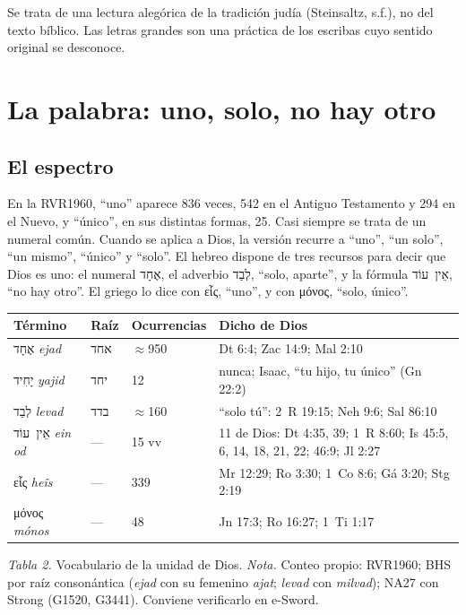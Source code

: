 \documentclass[11pt,letterpaper]{article}
\newcommand{\heb}[1]{\mbox{\foreignlanguage{hebrew}{#1}}}
\newcommand{\grc}[1]{\foreignlanguage{ancientgreek}{#1}}
\begin{document}
\begin{nota}[Precisión]
Se trata de una lectura alegórica de la tradición judía (Steinsaltz, s.f.), no del texto bíblico. Las letras grandes son una práctica de los escribas cuyo sentido original se desconoce.
\end{nota}

\section{La palabra: uno, solo, no hay otro}

\subsection{El espectro}
En la RVR1960, ``uno'' aparece 836 veces, 542 en el Antiguo Testamento y 294 en el Nuevo, y ``único'', en sus distintas formas, 25. Casi siempre se trata de un numeral común. Cuando se aplica a Dios, la versión recurre a ``uno'', ``un solo'', ``un mismo'', ``único'' y ``solo''. El hebreo dispone de tres recursos para decir que Dios es uno: el numeral \heb{אֶחָד}, el adverbio \heb{לְבַד}, ``solo, aparte'', y la fórmula \heb{אֵין עוֹד}, ``no hay otro''. El griego lo dice con \grc{εἷς}, ``uno'', y con \grc{μόνος}, ``solo, único''.

\begin{center}\small\renewcommand{\arraystretch}{1.25}
\begin{tabular}{@{}L{2.8cm}L{1.4cm}L{2.2cm}L{8.0cm}@{}}
\toprule
\textbf{Término} & \textbf{Raíz} & \textbf{Ocurrencias} & \textbf{Dicho de Dios} \\ \midrule
\heb{אֶחָד} \emph{ejad} & \heb{אחד} & $\approx$950 & Dt 6:4; Zac 14:9; Mal 2:10 \\
\heb{יָחִיד} \emph{yajid} & \heb{יחד} & 12 & nunca; Isaac, ``tu hijo, tu único'' (Gn 22:2) \\
\heb{לְבַד} \emph{levad} & \heb{בדד} & $\approx$160 & ``solo tú'': 2~R 19:15; Neh 9:6; Sal 86:10 \\
\heb{אֵין עוֹד} \emph{ein od} & --- & 15 vv & 11 de Dios: Dt 4:35, 39; 1~R 8:60; Is 45:5, 6, 14, 18, 21, 22; 46:9; Jl 2:27 \\
\grc{εἷς} \emph{heîs} & --- & 339 & Mr 12:29; Ro 3:30; 1~Co 8:6; Gá 3:20; Stg 2:19 \\
\grc{μόνος} \emph{mónos} & --- & 48 & Jn 17:3; Ro 16:27; 1~Ti 1:17 \\
\bottomrule
\end{tabular}\par
{\footnotesize\color{gris}\textit{Tabla 2.} Vocabulario de la unidad de Dios. \textit{Nota.} Conteo propio: RVR1960; BHS por raíz consonántica (\emph{ejad} con su femenino \emph{ajat}; \emph{levad} con \emph{milvad}); NA27 con Strong (G1520, G3441). Conviene verificarlo en e-Sword.}
\end{center}
\end{document}
